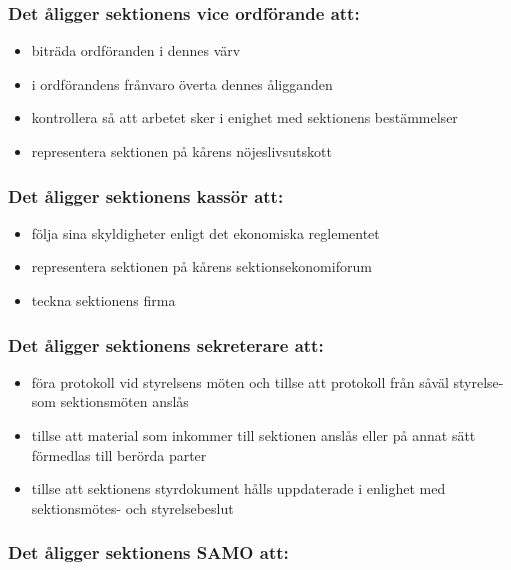 \subsubsection{Det åligger sektionens vice ordförande att:}

\begin{itemize}
  \item biträda ordföranden i dennes värv 
  \item i ordförandens frånvaro överta dennes åligganden 
  \item kontrollera så att arbetet sker i enighet med sektionens bestämmelser 
  \item representera sektionen på kårens nöjeslivsutskott
\end{itemize}

\subsubsection{Det åligger sektionens kassör att:}

\begin{itemize}
  \item följa sina skyldigheter enligt det ekonomiska reglementet
  \item representera sektionen på kårens sektionsekonomiforum
  \item teckna sektionens firma
\end{itemize}

\subsubsection{Det åligger sektionens sekreterare att:}

\begin{itemize}
  \item föra protokoll vid styrelsens möten och tillse att protokoll från såväl styrelse- som sektionsmöten anslås
  \item tillse att material som inkommer till sektionen anslås eller på annat sätt förmedlas till berörda parter
  \item tillse att sektionens styrdokument hålls uppdaterade i enlighet med sektionsmötes- och styrelsebeslut
\end{itemize}

\subsubsection{Det åligger sektionens SAMO att:}

